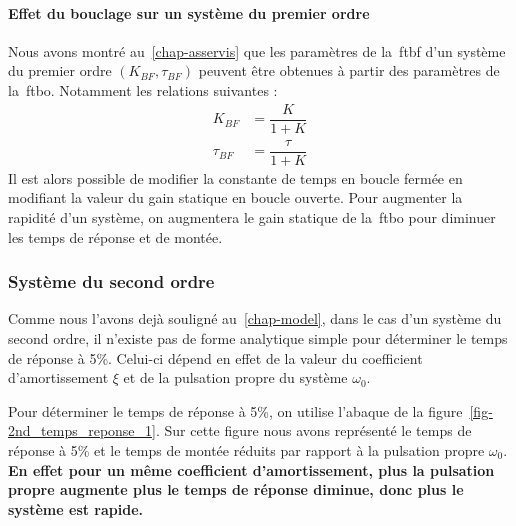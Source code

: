 \paragraph{Effet du bouclage sur un système du premier ordre}
Nous avons montré au~\cref{chap-asservis} que les paramètres de 
la~\gls{ftbf} d'un système du premier ordre $(K_{BF},\tau_{BF})$ peuvent 
être obtenues à partir des paramètres de la~\gls{ftbo}. Notamment les relations
suivantes :
\begin{align*}
       K_{BF}&=\dfrac{K}{1+K}\\
    \tau_{BF}&=\dfrac{\tau}{1+K}
\end{align*}
Il est alors possible de modifier la constante de temps en boucle fermée en 
modifiant la valeur du gain statique en boucle ouverte. Pour augmenter
la rapidité d'un système, on augmentera le gain statique de la~\gls{ftbo} pour
diminuer les temps de réponse et de montée.
\subsubsection{Système du second ordre}
Comme nous l'avons dejà souligné au~\cref{chap-model}, dans le cas d'un système
du second ordre, il n'existe pas de forme analytique simple pour déterminer 
le temps de réponse à 5\%. Celui-ci dépend en effet de la valeur du coefficient 
d'amortissement $\xi$ et de la pulsation propre du système $\omega_0$.

Pour déterminer le temps de réponse à 5\%, on utilise l'abaque de la 
figure~\cref{fig-2nd_temps_reponse_1}. Sur cette figure nous avons représenté
le temps de réponse à 5\% et le temps de montée réduits par rapport à la
pulsation propre $\omega_0$. \textbf{En effet pour un même coefficient 
d'amortissement, plus la pulsation propre augmente plus le temps de réponse 
diminue, donc plus le système est rapide.}


